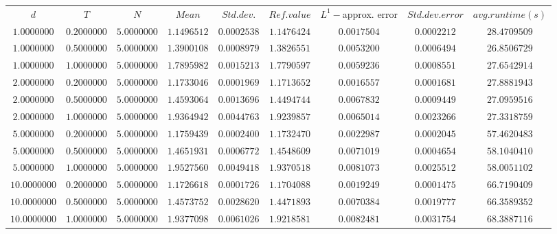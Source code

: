 \begin{tabular}{ccccccccc}
$d$ & $T$ & $N$ & $Mean$ & $Std. dev.$ & $Ref. value$ & $L^1-$approx. error & $Std. dev. error$ & $avg. runtime (s)$\\
$1.0000000$ & $0.2000000$ & $5.0000000$ & $1.1496512$ & $0.0002538$ & $1.1476424$ & $0.0017504$ & $0.0002212$ & $28.4709509$\\
$1.0000000$ & $0.5000000$ & $5.0000000$ & $1.3900108$ & $0.0008979$ & $1.3826551$ & $0.0053200$ & $0.0006494$ & $26.8506729$\\
$1.0000000$ & $1.0000000$ & $5.0000000$ & $1.7895982$ & $0.0015213$ & $1.7790597$ & $0.0059236$ & $0.0008551$ & $27.6542914$\\
$2.0000000$ & $0.2000000$ & $5.0000000$ & $1.1733046$ & $0.0001969$ & $1.1713652$ & $0.0016557$ & $0.0001681$ & $27.8881943$\\
$2.0000000$ & $0.5000000$ & $5.0000000$ & $1.4593064$ & $0.0013696$ & $1.4494744$ & $0.0067832$ & $0.0009449$ & $27.0959516$\\
$2.0000000$ & $1.0000000$ & $5.0000000$ & $1.9364942$ & $0.0044763$ & $1.9239857$ & $0.0065014$ & $0.0023266$ & $27.3318759$\\
$5.0000000$ & $0.2000000$ & $5.0000000$ & $1.1759439$ & $0.0002400$ & $1.1732470$ & $0.0022987$ & $0.0002045$ & $57.4620483$\\
$5.0000000$ & $0.5000000$ & $5.0000000$ & $1.4651931$ & $0.0006772$ & $1.4548609$ & $0.0071019$ & $0.0004654$ & $58.1040410$\\
$5.0000000$ & $1.0000000$ & $5.0000000$ & $1.9527560$ & $0.0049418$ & $1.9370518$ & $0.0081073$ & $0.0025512$ & $58.0051102$\\
$10.0000000$ & $0.2000000$ & $5.0000000$ & $1.1726618$ & $0.0001726$ & $1.1704088$ & $0.0019249$ & $0.0001475$ & $66.7190409$\\
$10.0000000$ & $0.5000000$ & $5.0000000$ & $1.4573752$ & $0.0028620$ & $1.4471893$ & $0.0070384$ & $0.0019777$ & $66.3589352$\\
$10.0000000$ & $1.0000000$ & $5.0000000$ & $1.9377098$ & $0.0061026$ & $1.9218581$ & $0.0082481$ & $0.0031754$ & $68.3887116$\\
\end{tabular}
